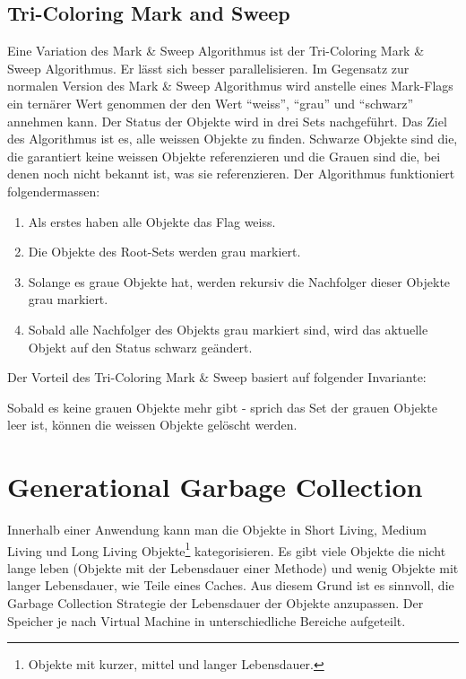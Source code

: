\subsection{Tri-Coloring Mark and Sweep}\label{tri-coloring mark and sweep}
Eine Variation des Mark \& Sweep Algorithmus ist der Tri-Coloring Mark \& Sweep Algorithmus. Er lässt sich besser parallelisieren\cite[S. 79]{lagergren2010oracle}. Im Gegensatz zur normalen Version des Mark \& Sweep Algorithmus wird anstelle eines Mark-Flags ein ternärer Wert genommen der den Wert ``weiss'', ``grau'' und ``schwarz'' annehmen kann. Der Status der Objekte wird in drei Sets nachgeführt. Das Ziel des Algorithmus ist es, alle weissen Objekte zu finden. Schwarze Objekte sind die, die garantiert keine weissen Objekte referenzieren und die Grauen sind die, bei denen noch nicht bekannt ist, was sie referenzieren. Der Algorithmus funktioniert folgendermassen:

\begin{enumerate}
	\item Als erstes haben alle Objekte das Flag weiss.
	\item Die Objekte des Root-Sets werden grau markiert.
	\item Solange es graue Objekte hat, werden rekursiv die Nachfolger dieser Objekte grau markiert.
	\item Sobald alle Nachfolger des Objekts grau markiert sind, wird das aktuelle Objekt auf den Status schwarz geändert.
\end{enumerate}

Der Vorteil des Tri-Coloring Mark \& Sweep basiert auf folgender Invariante:
\begin{center}
\end{center}
Sobald es keine grauen Objekte mehr gibt - sprich das Set der grauen Objekte leer ist, können die weissen Objekte gelöscht werden.

\section{Generational Garbage Collection}\label{generational gc}
Innerhalb einer Anwendung kann man die Objekte in Short Living, Medium Living und Long Living Objekte\footnote{Objekte mit kurzer, mittel und langer Lebensdauer.} kategorisieren. Es gibt viele Objekte die nicht lange leben (Objekte mit der Lebensdauer einer Methode) und wenig Objekte mit langer Lebensdauer, wie Teile eines Caches. Aus diesem Grund ist es sinnvoll, die Garbage Collection Strategie der Lebensdauer der Objekte anzupassen. Der Speicher je nach Virtual Machine in unterschiedliche Bereiche aufgeteilt.
